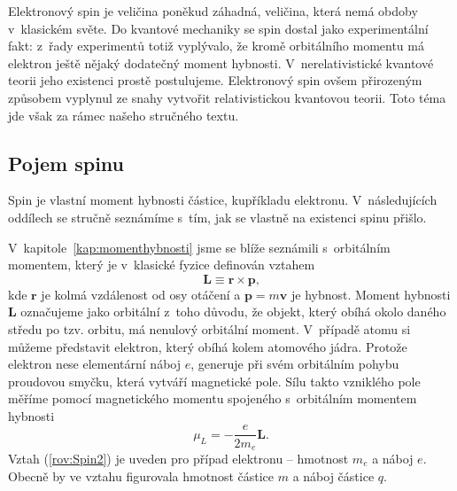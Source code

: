 Elektronový spin je veličina poněkud záhadná, veličina, která nemá obdoby v~klasickém světe. Do kvantové mechaniky se spin dostal jako experimentální fakt: z~řady experimentů totiž vyplývalo, že kromě orbitálního momentu má elektron ještě nějaký dodatečný moment hybnosti. V~nerelativistické kvantové teorii jeho existenci prostě postulujeme. Elektronový spin ovšem přirozeným způsobem vyplynul ze snahy vytvořit relativistickou kvantovou teorii. Toto téma jde však za rámec našeho stručného textu.

\subsection{Pojem spinu}
\label{kap:PojemSpinu}

Spin je vlastní moment hybnosti částice, kupříkladu elektronu. V~následujících oddílech se stručně seznámíme s~tím, jak se vlastně na existenci spinu přišlo.

V~kapitole~\ref{kap:momenthybnosti} jsme se blíže seznámili s~orbitálním momentem, který je v~klasické fyzice definován vztahem
\begin{equation}
\mathbf{L} \equiv \mathbf{r} \times \mathbf{p} \mbox{,}
\label{rov:Spin1}
\end{equation}
kde $\mathbf{r}$ je kolmá vzdálenost od osy otáčení a $\mathbf{p} = m \mathbf{v}$ je hybnost. Moment hybnosti $\mathbf{L}$ označujeme jako orbitální z~toho důvodu, že objekt, který obíhá okolo daného středu po tzv. orbitu, má nenulový orbitální moment. V~případě atomu si můžeme představit elektron, který obíhá kolem atomového jádra. Protože elektron nese elementární náboj $e$, generuje při svém orbitálním pohybu proudovou smyčku, která vytváří magnetické pole. Sílu takto vzniklého pole měříme pomocí magnetického momentu spojeného s~orbitálním momentem hybnosti
\begin{equation}
\mu_L = -\frac{e}{2m_e}\mathbf{L} \mbox{.}
\label{rov:Spin2}
\end{equation}
Vztah (\ref{rov:Spin2}) je uveden pro případ elektronu -- hmotnost $m_e$ a náboj $e$. Obecně by ve vztahu figurovala hmotnost částice $m$ a náboj částice $q$. 

